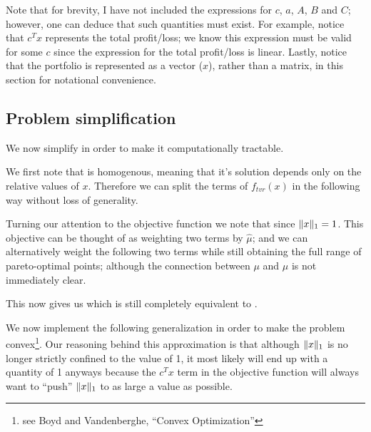 \documentclass{article}
\begin{document}
    Note that for brevity, I have not included the expressions for 
        $c$, $a$, $A$, $B$ and $C$; 
        however, one can deduce that such quantities must exist.
    For example, notice that $c^T x$ represents the total profit/loss;
        we know this expression must be valid for some $c$ 
        since the expression for the total profit/loss is linear.
    Lastly, notice that the portfolio is represented as a vector ($x$),
        rather than a matrix, in this section for notational convenience.

\subsection{Problem simplification}
    We now simplify  in order 
        to make it computationally tractable.

    We first note that  is homogenous,
        meaning that it's solution depends only on the relative values of $x$.
    Therefore we can split the terms of $f_{tvr}(x)$ in the following way
        without loss of generality.

    Turning our attention to the objective function we note that
        since $\|x\|_1 = 1$.
    This objective can be thought of as 
        weighting two terms by $\hat{\mu}$;
        and we can alternatively weight the following two terms
        while still obtaining the full range of pareto-optimal points;
        although the connection between $\mu$ and $\hat{\mu}$
        is not immediately clear.

    This now gives us
        which is still completely equivalent to .

    We now implement the following generalization
        in order to make the problem 
        convex\footnote{see Boyd and Vandenberghe, ``Convex Optimization''}.
    Our reasoning behind this approximation
        is that although $\|x\|_1$ is no longer 
        strictly confined to the value of 1,
        it most likely will end up with a quantity of 1 anyways
        because the $c^T x$ term in the objective function will always want
        to ``push'' $\|x\|_1$ to as large a value as possible.
\end{document}
